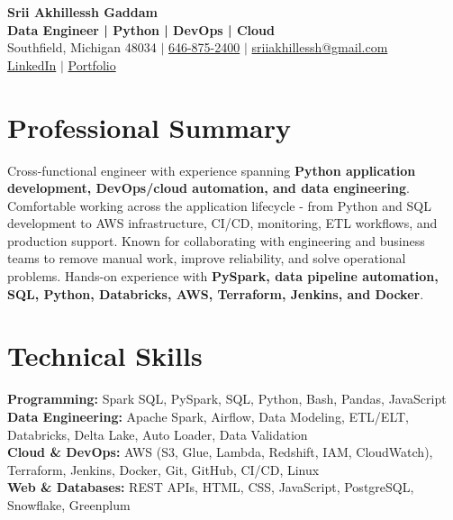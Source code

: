 \documentclass[letterpaper,10pt]{article}
\begin{document}
\fontsize{9.35pt}{10.45pt}\selectfont

\begin{center}
    {\LARGE \textbf{Srii Akhillessh Gaddam}} \\[-1pt]
    \textbf{Data Engineer | Python | DevOps | Cloud} \\[2pt]
    Southfield, Michigan 48034 $|$
    \href{tel:6468752400}{646-875-2400} $|$
    \href{mailto:sriiakhillessh@gmail.com}{sriiakhillessh@gmail.com} \\[1pt]
    \href{https://www.linkedin.com/in/srii-akhiilessh-gaddam-b48668191/}{LinkedIn} $|$
    \href{https://sriiakhillesshg.github.io/portfolio/}{Portfolio}
\end{center}
\vspace{-8pt}

\section{Professional Summary}
\small{Cross-functional engineer with experience spanning \textbf{Python application development, DevOps/cloud automation, and data engineering}. Comfortable working across the application lifecycle - from Python and SQL development to AWS infrastructure, CI/CD, monitoring, ETL workflows, and production support. Known for collaborating with engineering and business teams to remove manual work, improve reliability, and solve operational problems. Hands-on experience with \textbf{PySpark, data pipeline automation, SQL, Python, Databricks, AWS, Terraform, Jenkins, and Docker}.}

\section{Technical Skills}
\small{
\textbf{Programming:} Spark SQL, PySpark, SQL, Python, Bash, Pandas, JavaScript \\
\textbf{Data Engineering:} Apache Spark, Airflow, Data Modeling, ETL/ELT, Databricks, Delta Lake, Auto Loader, Data Validation \\
\textbf{Cloud \& DevOps:} AWS (S3, Glue, Lambda, Redshift, IAM, CloudWatch), Terraform, Jenkins, Docker, Git, GitHub, CI/CD, Linux \\
\textbf{Web \& Databases:} REST APIs, HTML, CSS, JavaScript, PostgreSQL, Snowflake, Greenplum
}

\end{document}
